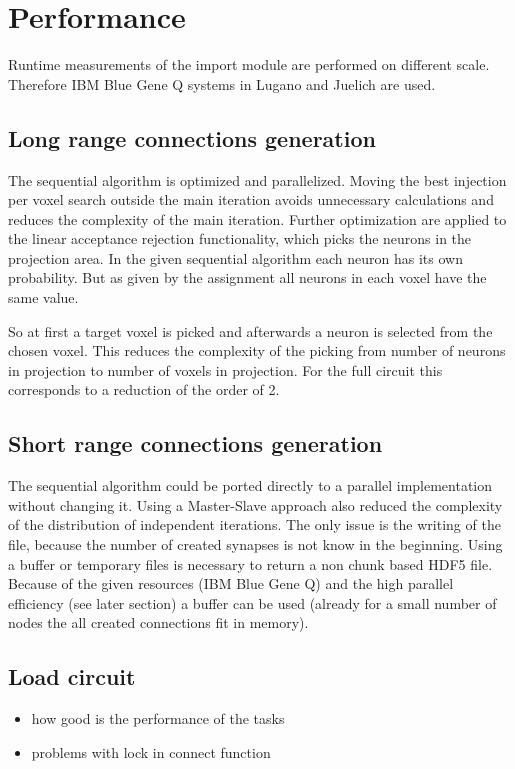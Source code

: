 \section{Performance}
Runtime measurements of the import module are performed on different scale.
Therefore IBM Blue Gene Q systems in Lugano and Juelich are used.

\subsection{Long range connections generation}
The sequential algorithm is optimized and parallelized. Moving the best injection per voxel search outside the main iteration
avoids unnecessary calculations and reduces the complexity of the main iteration. Further optimization are applied
to the linear acceptance rejection functionality, which picks the neurons in the projection area.
In the given sequential algorithm each neuron has its own probability.
But as given by the assignment all neurons in each voxel have the same value.

So at first a target voxel is picked and afterwards a neuron is selected from the chosen voxel.
This reduces the complexity of the picking from number of neurons in projection to number of voxels in projection.
For the full circuit this corresponds to a reduction of the order of 2.


\subsection{Short range connections generation}
The sequential algorithm could be ported directly to a parallel implementation without changing it.
Using a Master-Slave approach also reduced the complexity of the distribution of independent iterations.
The only issue is the writing of the file, because the number of created synapses is not know in the beginning.
Using a buffer or temporary files is necessary to return a non chunk based HDF5 file.
Because of the given resources (IBM Blue Gene Q) and the high parallel efficiency (see later section)
a buffer can be used (already for a small number of nodes the all created connections fit in memory).

\subsection{Load circuit}

\begin{itemize}
	\item how good is the performance of the tasks
    \item problems with lock in connect function
\end{itemize}


